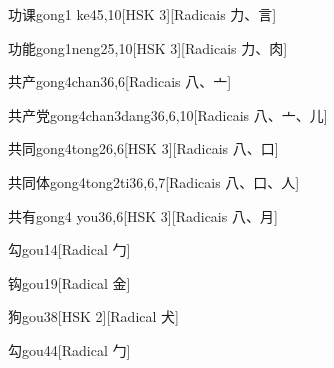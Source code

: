\begin{entry}{功课}{gong1 ke4}{5,10}[HSK 3][Radicais ⼒、⾔]
\end{entry}

\begin{entry}{功能}{gong1neng2}{5,10}[HSK 3][Radicais ⼒、⾁]
\end{entry}

\begin{entry}{共产}{gong4chan3}{6,6}[Radicais ⼋、⼇]
\end{entry}

\begin{entry}{共产党}{gong4chan3dang3}{6,6,10}[Radicais ⼋、⼇、⼉]
\end{entry}

\begin{entry}{共同}{gong4tong2}{6,6}[HSK 3][Radicais ⼋、⼝]
\end{entry}

\begin{entry}{共同体}{gong4tong2ti3}{6,6,7}[Radicais ⼋、⼝、⼈]
\end{entry}

\begin{entry}{共有}{gong4 you3}{6,6}[HSK 3][Radicais ⼋、⽉]
\end{entry}

\begin{entry}{勾}{gou1}{4}[Radical ⼓]
\end{entry}

\begin{entry}{钩}{gou1}{9}[Radical ⾦]
\end{entry}

\begin{entry}{狗}{gou3}{8}[HSK 2][Radical ⽝]
\end{entry}

\begin{entry}{勾}{gou4}{4}[Radical ⼓]
\end{entry}

